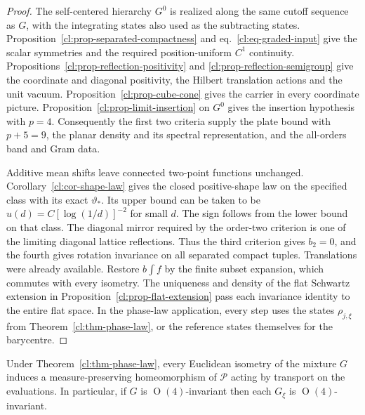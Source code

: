 \documentclass[11pt,letterpaper,reqno]{amsart}
\makeatletter
\numberwithin{equation}{section}
\renewcommand{\eqref}[1]{\textup{eq.~\ref{#1}}}
\theoremstyle{definition}
\newcommand{\ms@majorstart}{%
  \pushQED{\qed}\renewcommand{\qedsymbol}{$\blacksquare\square$}}
\newenvironment{corollary}[1][]{\ms@majorstart\ms@corollary[#1]}
  {\popQED\endms@corollary}
\theoremstyle{remark}
\makeatother
\begin{document}
\begin{proof}
The self-centered hierarchy \(G^0\) is realized along
the same cutoff sequence as \(G\), with the integrating
states also used as the subtracting states.
Proposition~\ref{cl:prop-separated-compactness} and
\eqref{cl:eq-graded-input} give the scalar symmetries
and the required position-uniform \(C^1\) continuity.
Propositions~\ref{cl:prop-reflection-positivity} and
\ref{cl:prop-reflection-semigroup} give the coordinate
and diagonal positivity, the Hilbert translation actions
and the unit vacuum. Proposition~\ref{cl:prop-cube-cone}
gives the carrier in every coordinate picture.
Proposition~\ref{cl:prop-limit-insertion} on \(G^0\)
gives the insertion hypothesis with \(p=4\).
Consequently the first two criteria supply the plate
bound with \(p+5=9\), the planar density and its spectral
representation, and the all-orders band and Gram data.

Additive mean shifts leave connected two-point functions
unchanged. Corollary~\ref{cl:cor-shape-law} gives the
closed positive-shape law on the specified class with its
exact \(\vartheta_*\). Its upper bound can be taken to be
\(u(d)=C[\log(1/d)]^{-2}\) for small \(d\).
The sign follows from the lower bound on that class.
The diagonal mirror required by the order-two criterion
is one of the limiting diagonal lattice reflections.
Thus the third criterion gives \(b_2=0\), and the fourth
gives rotation invariance on all separated compact tuples.
Translations were already available. Restore \(b\int f\)
by the finite subset expansion, which commutes with every
isometry. The uniqueness and density of the flat Schwartz
extension in Proposition~\ref{cl:prop-flat-extension}
pass each invariance identity to the entire flat space.
In the phase-law application, every step uses the states
\(\rho_{j,\xi}\) from Theorem~\ref{cl:thm-phase-law}, or the
reference states themselves for the barycentre.
\end{proof}


\begin{corollary}[Isometries of the canonical phase law]
\label{cl:cor-phase-isometries}
Under Theorem~\ref{cl:thm-phase-law}, every Euclidean
isometry of the mixture \(G\) induces a measure-preserving
homeomorphism of \(\mathcal P\) acting by transport on
the evaluations. In particular, if \(G\) is
\(\operatorname{O}(4)\)-invariant then each \(G_\xi\)
is \(\operatorname{O}(4)\)-invariant.
\end{corollary}
\end{document}
